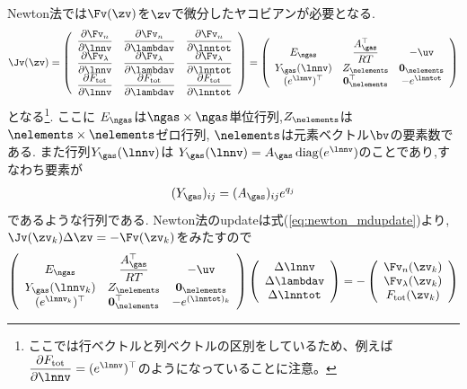 Newton法では$\Fv (\zv)$を$\zv$で微分したヤコビアンが必要となる. 
\begin{equation}
\label{eq:jacobian_tce}
\Jv (\zv) =
\left(
\begin{array}{ccc}
    \dfrac{\partial \Fv_n}{\partial \lnnv}  & \dfrac{\partial \Fv_n}{\partial \lambdav}& \dfrac{\partial \Fv_n}{\partial \lnntot}\\ 
    \dfrac{\partial \Fv_\lambda}{\partial \lnnv} & \dfrac{\partial \Fv_\lambda}{\partial \lambdav} & \dfrac{\partial \Fv_\lambda}{\partial \lnntot} \\
    \dfrac{\partial F_\mathrm{tot}}{\partial \lnnv} & \dfrac{\partial F_\mathrm{tot}}{\partial \lambdav} & \dfrac{\partial F_\mathrm{tot}}{\partial \lnntot} \\  
\end{array}
\right) =
\left(
\begin{array}{ccc}
 E_\ngas &  \dfrac{A_\gas^\top}{RT} & - \uv\\ 
 Y_\gas(\lnnv) & Z_\nelements & \boldsymbol{0}_\nelements \\ 
 (e^{\lnnv})^\top & \boldsymbol{0}_\nelements^\top & - e^\lnntot\\  
\end{array}
\right)
\end{equation}
となる\footnote{ここでは行ベクトルと列ベクトルの区別をしているため、例えば$\dfrac{\partial F_\mathrm{tot}}{\partial \lnnv} = (e^{\lnnv})^\top$のようになっていることに注意。}. ここに
$E_\ngas$は$\ngas \times \ngas$単位行列,$Z_\nelements$は$\nelements \times \nelements$ゼロ行列, $\nelements$は元素ベクトル$\bv$の要素数である. また行列$Y_\gas(\lnnv)$は
$Y_\gas({\lnnv})= A_\gas \, \mathrm{diag}(e^{\lnnv}) $のことであり,すなわち要素が
\begin{align}
(Y_\gas)_{ij} = (A_\gas)_{ij} e^{q_j}
\end{align}
であるような行列である. Newton法のupdateは式(\ref{eq:newton_mdupdate})より,$\Jv (\zv_k) \Delta \zv = - \Fv (\zv_k)$をみたすので
\begin{align}
    \left(
\begin{array}{ccc}
 E_\ngas &  \dfrac{A_\gas^\top}{RT} & - \uv\\ 
 Y_\gas({\lnnv}_k) & Z_\nelements & \boldsymbol{0}_\nelements \\ 
 (e^{{\lnnv}_k})^\top & \boldsymbol{0}_\nelements^\top & - e^{(\lnntot)_k}\\  
\end{array}
\right)
    \left(
\begin{array}{c}
\Delta \lnnv \\
\Delta \lambdav \\
\Delta \lnntot
\end{array}
\right)
= -
    \left(
\begin{array}{c}
\Fv_n (\zv_k) \\
\Fv_\lambda(\zv_k) \\
F_\mathrm{tot} (\zv_k)
\end{array}
\right)
\end{align}
